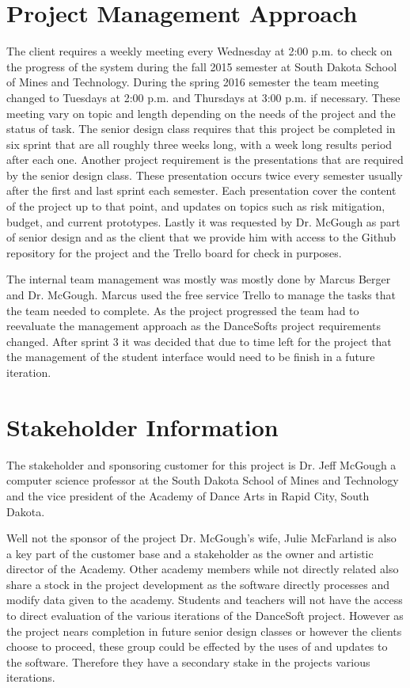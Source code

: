 \section{Project Management Approach}
The client requires a weekly meeting every Wednesday at 2:00 p.m. to check on the progress of the system during the fall 2015 semester at South Dakota School of Mines and Technology. During the spring 2016 semester the team meeting changed to Tuesdays at 2:00 p.m. and Thursdays at 3:00 p.m. if necessary. These meeting vary on topic and length depending on the needs of the project and the status of task. The senior design class requires that this project be completed in six sprint that are all roughly three weeks long, with a week long results period after each one. Another project requirement is the presentations that are required by the senior design class. These presentation occurs twice every semester usually after the first and last sprint each semester. Each presentation cover the content of the project up to that point, and updates on topics such as risk mitigation, budget, and current prototypes. Lastly it was requested by Dr. McGough as part of senior design and as the client that we provide him with access to the Github repository for the project and the Trello board for check in purposes.

The internal team management was mostly was mostly done by Marcus Berger and Dr. McGough. Marcus used the free service Trello to manage the tasks that the team needed to complete. As the project progressed the team had to reevaluate the management approach as the DanceSofts project requirements changed. After sprint 3 it was decided that due to time left for the project that the management of the student interface would need to be finish in a future iteration.    


\section{Stakeholder Information}

The stakeholder and sponsoring customer for this project is Dr. Jeff McGough a computer science professor at the South Dakota School of Mines and Technology and the vice president of the Academy of Dance Arts in Rapid City, South Dakota.


Well not the sponsor of the project Dr. McGough's wife, Julie McFarland is also a key part of the customer base and a stakeholder as the owner and artistic director of the Academy. Other academy members while not directly related also share a stock in the project development as the software directly processes and modify data given to the academy. Students and teachers will not have the access to direct evaluation of the various iterations of the DanceSoft project. However as the project nears completion in future senior design classes or however the clients choose to proceed, these group could be effected by the uses of and updates to the software. Therefore they have a secondary stake in the projects various iterations. 


